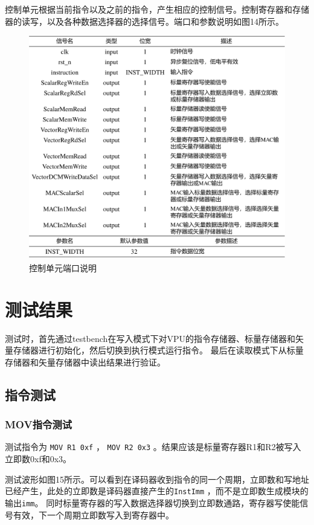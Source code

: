 \documentclass[UTF8]{ctexart}
\begin{document}
控制单元根据当前指令以及之前的指令，产生相应的控制信号。控制寄存器和存储器的读写，以及各种数据选择器的选择信号。端口和参数说明如图14所示。

\begin{figure}[htbp]
    \centering
    \includegraphics[width=16cm]{pic/Control.png}
    \caption{控制单元端口说明}
\end{figure}

\section{测试结果}
测试时，首先通过testbench在写入模式下对VPU的指令存储器、标量存储器和矢量存储器进行初始化，然后切换到执行模式运行指令。
最后在读取模式下从标量存储器和矢量存储器中读出结果进行验证。

\subsection{指令测试}

\subsubsection{MOV指令测试}
测试指令为 \verb|MOV R1 0xf| ， \verb|MOV R2 0x3| 。结果应该是标量寄存器R1和R2被写入立即数0xf和0x3。

测试波形如图15所示。可以看到在译码器收到指令的同一个周期，立即数和写地址已经产生，此处的立即数是译码器直接产生的\verb|InstImm| ，而不是立即数生成模块的输出\verb|imm|。
同时标量寄存器的写入数据选择器切换到立即数通路，寄存器写使能信号有效，下一个周期立即数写入到寄存器中。
\end{document}

